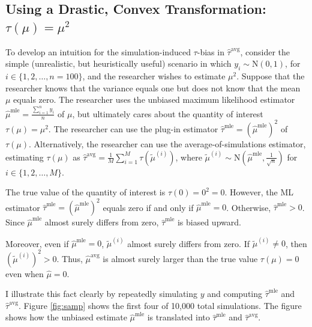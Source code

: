 \documentclass[12pt]{article}
\begin{document}
\subsection*{Using a Drastic, Convex Transformation: $\tau(\mu) = \mu^2$}

To develop an intuition for the simulation-induced $\tau$-bias in $\hat{\tau}^\text{avg}$, consider the simple (unrealistic, but heuristically useful) scenario in which $y_i \sim \text{N}(0, 1)$, for $i \in \{1, 2, \ldots, n = 100\}$, and the researcher wishes to estimate $\mu^2$. Suppose that the researcher knows that the variance equals one but does not know that the mean $\mu$ equals zero. The researcher uses the unbiased maximum likelihood estimator $\hat{\mu}^\text{mle} = \frac{\sum_{i=1}^n y_i}{n}$ of $\mu$, but ultimately cares about the quantity of interest $\tau(\mu) = \mu^2$. The researcher can use the plug-in estimator $\hat{\tau}^\text{mle} = \left( \hat{\mu}^\text{mle} \right) ^2$ of $\tau(\mu)$. Alternatively, the researcher can use the average-of-simulations estimator, estimating $\tau(\mu)$ as $\hat{\tau}^\text{avg} = \frac{1}{M} \sum_{i = 1}^M \tau \left( \tilde{\mu}^{(i)} \right)$, where $\tilde{\mu}^{(i)} \sim \text{N} \left( \hat{\mu}^\text{mle}, \frac{1}{\sqrt{n}} \right)$ for $i \in \{1, 2,\ldots, M\}$.

The true value of the quantity of interest is $\tau(0) = 0^2 = 0$. However, the ML estimator $\hat{\tau}^\text{mle} = \left( \hat{\mu}^\text{mle} \right)^2$ equals zero if and only if $\hat{\mu}^\text{mle} = 0$. Otherwise, $\hat{\tau}^\text{mle} > 0$. Since $\hat{\mu}^\text{mle}$ almost surely differs from zero,  $\hat{\tau}^\text{mle}$ is biased upward.

Moreover, even if $\hat{\mu}^\text{mle} = 0$, $\tilde{\mu}^{(i)}$ almost surely differs from zero. If $\tilde{\mu}^{(i)} \neq 0$, then $\left( \tilde{\mu}^{(i)} \right)^2 > 0$. Thus, $\hat{\mu}^\text{avg}$ is almost surely larger than the true value $\tau(\mu) = 0$ even when $\hat{\mu} = 0$.

I illustrate this fact clearly by repeatedly simulating $y$ and computing $\hat{\tau}^\text{mle}$ and $\hat{\tau}^\text{avg}$. Figure \ref{fig:samp} shows the first four of 10,000 total simulations. The figure shows how the unbiased estimate $\hat{\mu}^\text{mle}$ is translated into $\hat{\tau}^\text{mle}$ and $\hat{\tau}^\text{avg}$.
\end{document}

